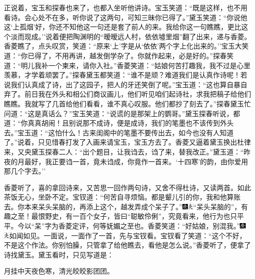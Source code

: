 正说着，宝玉和探春也来了，也都入坐听他讲诗。宝玉笑道：``既是这样，也不用看诗。会心处不在多，听你说了这两句，可知三昧你已得了。''黛玉笑道：``你说他这`上孤烟'好，你还不知他这一句还是套了前人的来。我给你这一句瞧瞧，更比这个淡而现成。''说着便把陶渊明的``暧暧远人村，依依墟里烟''翻了出来，递与香菱。香菱瞧了，点头叹赏，笑道：``原来`上'字是从`依依'两个字上化出来的。''宝玉大笑道：``你已得了，不用再讲，越发倒学杂了。你就作起来，必是好的。''探春笑道：``明儿我补一个柬来，请你入社。''香菱笑道：``姑娘何苦打趣我，我不过是心里羡慕，才学着顽罢了。''探春黛玉都笑道：``谁不是顽？难道我们是认真作诗呢！若说我们认真成了诗，出了这园子，把人的牙还笑倒了呢。''宝玉道：``这也算自暴自弃了。前日我在外头和相公们商议画儿，他们听见咱们起诗社，求我把稿子给他们瞧瞧。我就写了几首给他们看看，谁不真心叹服。他们都抄了刻去了。''探春黛玉忙问道：``这是真话么？''宝玉笑道：``说谎的是那架上的鹦哥。''黛玉探春听说，都道：``你真真胡闹！且别说那不成诗，便是成诗，我们的笔墨也不该传到外头去。''宝玉道：``这怕什么！古来闺阁中的笔墨不要传出去，如今也没有人知道了。''说着，只见惜春打发了入画来请宝玉，宝玉方去了。香菱又逼着黛玉换出杜律来，又央黛玉探春二人：``出个题目，让我诌去，诌了来，替我改正。''黛玉道：``昨夜的月最好，我正要诌一首，竟未诌成，你竟作一首来。`十四寒'的韵，由你爱用那几个字去。''

香菱听了，喜的拿回诗来，又苦思一回作两句诗，又舍不得杜诗，又读两首。如此茶饭无心，坐卧不定。宝钗道：``何苦自寻烦恼。都是颦儿引的你，我和他算账去。你本来呆头呆脑的，再添上这个，越发弄成个呆子了。''{\includegraphics[width=3mm]{../Images/00004}\includegraphics[width=3mm]{../Images/00012}\footnotesize \kaishu ``呆头呆脑的''，有趣之至！最恨野史，有一百个女子，皆曰``聪敏伶俐''，究竟看来，他行为也只平平。今以``呆''字为香菱定评，何等妩媚之至也。}香菱笑道：``好姑娘，别混我。''{\includegraphics[width=3mm]{../Images/00004}\includegraphics[width=3mm]{../Images/00012}\footnotesize \kaishu 如闻如见。}一面说，一面作了一首，先与宝钗看。宝钗看了笑道：``这个不好，不是这个作法。你别怕臊，只管拿了给他瞧去，看他是怎么说。''香菱听了，便拿了诗找黛玉。黛玉看时，只见写道是：

月挂中天夜色寒，清光皎皎影团团。

